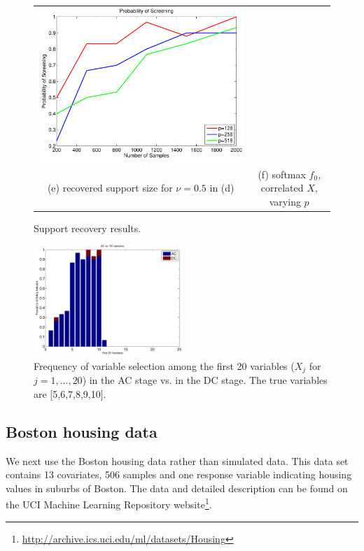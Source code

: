 \begin{figure}[!t]
\begin{center}
\begin{tabular}{cc}
\includegraphics[width=.42\textwidth]{figs/CurveS}\\
(e) recovered support size for $\nu=0.5$ in (d) & (f) softmax $f_0$, correlated $X$, varying $p$ \\
\end{tabular}
\end{center}
\caption{Support recovery results.}
\label{Support}
\vskip10pt
\end{figure}

\begin{figure}
\includegraphics[width=0.5\textwidth]{figs/ACvDC}
\caption{Frequency of variable selection among the first 20 variables ($X_j$ for $j=1,...,20$) in the AC stage vs. in the DC stage. The true variables are [5,6,7,8,9,10].}
\label{fig:ac_v_dc}
\end{figure}


\subsection{Boston housing data}

We next use the Boston housing data rather than simulated data. This data set
contains 13 covariates, 506 samples and one response variable
indicating housing values in suburbs of Boston. The data and detailed description
can be found on the UCI Machine Learning Repository website\footnote{\url{http://archive.ics.uci.edu/ml/datasets/Housing}}. 

